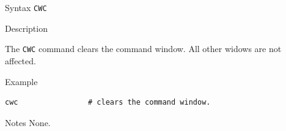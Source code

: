 %
%
\pagebreak
{}

\begin{iPageDescEntry}{Syntax}
\texttt{CWC } \\
\end{iPageDescEntry}

\begin{iPageDescEntry}{Description}

The \texttt{CWC} command clears the command window. All other widows are not affected.

\end{iPageDescEntry}

\begin{iPageDescOpEntry}{Example}
\begin{lstlisting}[style=iPageOpStyle]
cwc                # clears the command window.
\end{lstlisting}
\end{iPageDescOpEntry}

\begin{iPageDescEntry}{Notes}
None.
\end{iPageDescEntry}
